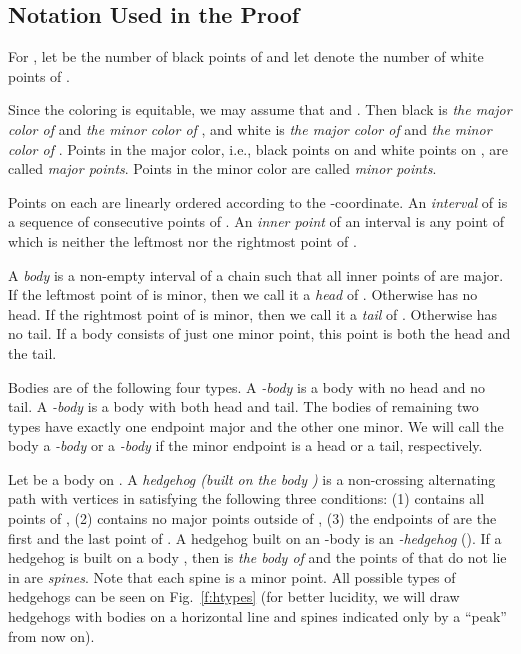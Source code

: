 \documentclass[12pt]{article}
\newcommand{\myfig}[2]  {\onefigure{{g-#1.eps}}{\label{f:#1} #2} }
\begin{document}
\subsection{Notation Used in the Proof}

For , let  be the number of black points of  and
let  denote the number of white points of
. 

Since the coloring is equitable, we may assume that 
 and .
Then black is {\em the major color of}  and
{\em the minor color of} , and white is {\em the major color
of}  and {\em the minor color of} . Points in the major
color, i.e., black points on  and white points on , are
called {\em major points}. Points in the minor color are called
{\em minor points}.

Points on each  are linearly ordered according to the -coordinate.
An {\em interval\/} of  is a sequence of consecutive points of .
An {\em inner point\/} of an interval  is any point of  which is
neither the leftmost nor the rightmost point of .

\myfig{hedgehog}{a hedgehog in }

A {\em body}  is a non-empty interval of a chain  
such that all inner points of  are major.
If the leftmost point of  is minor, then we call it a {\em head\/}
of . Otherwise  has no head. If the rightmost point of 
is minor, then we call it a {\em tail\/} of . Otherwise  has no tail.
If a body consists of just one minor point, this point is both the head
and the tail.

Bodies are of the following four types. A {\em -body\/} is a body with
no head and no tail. A {\em -body\/} is a body with both head
and tail. The bodies of remaining two types have exactly one endpoint major
and the other one minor. We will call the body a {\em -body\/} or
a {\em -body\/} if the minor endpoint is a head or a tail, respectively.

Let  be a body on . A {\em hedgehog (built on the body
)\/} is a non-crossing alternating path 
with vertices in  satisfying
the following three conditions: (1)  contains all points of , (2) 
contains no major points outside of , (3) the endpoints of  are
the first and the last point of .
A hedgehog built on an -body is an {\em -hedgehog\/}
(). If a hedgehog  is built on a body , then  is
{\em the body of \/} and the points of  that do not lie in  are
{\em spines}. Note that each spine is a minor point. All possible types of 
hedgehogs can be seen on Fig.~\ref{f:htypes} (for better lucidity, we will draw
hedgehogs with bodies on a horizontal line and spines indicated only by a
``peak'' from now on).
\end{document}
